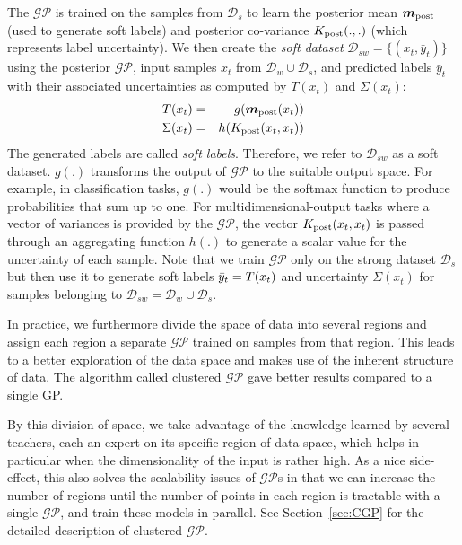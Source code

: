The $\mathcal{GP}$ is trained on the samples from $\mathcal{D}_s$ to learn the posterior mean $\bm{m}_{\rm post}$ (used to generate soft labels) and posterior co-variance $K_{\rm post}(.,.)$ (which represents label uncertainty).
We then create the \emph{soft dataset} $\mathcal{D}_{sw}=\{(x_t,\bar{y}_t)\}$ using the posterior $\mathcal{GP}$, input samples $x_t$ from $\mathcal{D}_w \cup \mathcal{D}_s$, and predicted labels $\bar{y}_t$ with their associated uncertainties as computed by $T(x_t)$ and $\Sigma(x_t)$:
\begin{eqnarray*}
\tfunc(x_t) &=& g(\bm{m}_{\rm post}(x_t))\\
\Sigma(x_t) &=& h(K_{\rm post}(x_t,x_t))
\sshrink
\end{eqnarray*}
The generated labels are called \emph{soft labels}. Therefore, we refer to $\mathcal{D}_{sw}$ as a soft dataset. $g(.)$ transforms the output of $\mathcal{GP}$ to the suitable output space. For example, in classification tasks, $g(.)$ would be the softmax function to produce probabilities that sum up to one. 
For multidimensional-output tasks where a vector of variances is provided by the $\mathcal{GP}$, the vector $K_{\rm post}(x_t,x_t)$ is passed through an aggregating function $h(.)$ to generate a scalar value for the uncertainty of each sample. 
Note that we train $\mathcal{GP}$ only on the strong dataset $\mathcal{D}_s$ but then use it to generate soft labels $\bar{y}_t = T(x_t)$ and uncertainty $\Sigma(x_t)$ for samples belonging to $\mathcal{D}_{sw}=\mathcal{D}_w\cup \mathcal{D}_s$.

In practice, we furthermore divide the space of data into several regions and assign each region a separate $\mathcal{GP}$ trained on samples from that region. This leads to a better exploration of the data space and makes use of the inherent structure of data. The algorithm called clustered $\mathcal{GP}$ gave better results compared to a single GP. 

By this division of space, we take advantage of the knowledge learned by several teachers, each an expert on its specific region of data space, which helps in particular when the dimensionality of the input is rather high. As a nice side-effect, this also solves the scalability issues of $\mathcal{GP}$s in that we can increase the number of regions until the number of points in each region is tractable with a single $\mathcal{GP}$, and train these models in parallel. See Section~\ref{sec:CGP} for the detailed description of clustered $\mathcal{GP}$.

